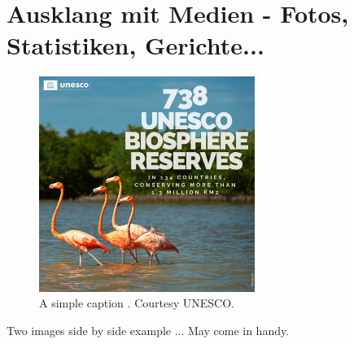 \section{Ausklang mit Medien - Fotos, Statistiken, Gerichte...}
\lipsum[14] %
\begin{figure}[H]
	\centering
	\includegraphics[width=70mm]{example-unesco.jpg}
	\caption{A simple caption \label{exampleLabel}. Courtesy UNESCO.}
\end{figure}
\lipsum[15-17] %
Two images side by side example ... May come in handy.
